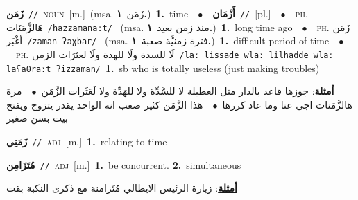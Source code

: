 \documentclass[10pt,a4paper,twoside]{article} %
\begin{document}
\begin{multicols}{2}
{\setlength\topsep{0pt}\textbf{\foreignlanguage{arabic}{زَمَن}}\ {\color{gray}\texttt{//}\color{black}}\ \textsc{noun}\ [m.]\ \color{gray}(msa. \foreignlanguage{arabic}{زَمَن}~\foreignlanguage{arabic}{\textbf{١.}})\color{black}\ \textbf{1.}~time\ \ $\bullet$\ \ \setlength\topsep{0pt}\textbf{\foreignlanguage{arabic}{أَزْمَان}}\ {\color{gray}\texttt{//}\color{black}}\ [pl.]\ \ $\bullet$\ \ \textsc{ph.} \color{gray} \foreignlanguage{arabic}{هَالزَّمَنَات}\color{black}\ {\color{gray}\texttt{/{\sffamily hazzamanaːt}/}\color{black}}\ \color{gray} (msa. \foreignlanguage{arabic}{منذ زمن بعيد}~\foreignlanguage{arabic}{\textbf{١.}})\color{black}\ \textbf{1.}~long time ago\ \ $\bullet$\ \ \textsc{ph.} \color{gray} \foreignlanguage{arabic}{زَمَن أغْبَر}\color{black}\ {\color{gray}\texttt{/{\sffamily zaman ʔaɣbar}/}\color{black}}\ \color{gray} (msa. \foreignlanguage{arabic}{فترة زمنيَّة صعبة}~\foreignlanguage{arabic}{\textbf{١.}})\color{black}\ \textbf{1.}~difficult period of time\ \ $\bullet$\ \ \textsc{ph.} \color{gray} \foreignlanguage{arabic}{لَا للسدة ولَا للهدة ولَا لعثرَات الزمن}\color{black}\ {\color{gray}\texttt{/{\sffamily laː lissade wlaː lilhadde wlaː laʕaθraːt ʔizzaman}/}\color{black}}\ \textbf{1.}~sb who is totally useless (just making troubles)\  \begin{flushright}\color{gray}\foreignlanguage{arabic}{\textbf{\underline{\foreignlanguage{arabic}{أمثلة}}}: جوزها قاعد بالدار مثل العطيلة لا للسَّدِّة ولا للهَدِّة ولا لَعَثَرات الزَّمَن\ $\bullet$\ \  مرة هالزَّمَنات اجى عنا وما عاد كررها\ $\bullet$\ \  هذا الزَّمَن كثير صعب انه الواحد يقدر يتزوج ويفتح بيت بسن صغير}\end{flushright}\color{black}} \vspace{2mm}

{\setlength\topsep{0pt}\textbf{\foreignlanguage{arabic}{زَمَنِي}}\ {\color{gray}\texttt{//}\color{black}}\ \textsc{adj}\ [m.]\ \textbf{1.}~relating to time\ } \vspace{2mm}

{\setlength\topsep{0pt}\textbf{\foreignlanguage{arabic}{مُتَزَامِن}}\ {\color{gray}\texttt{//}\color{black}}\ \textsc{adj}\ [m.]\ \textbf{1.}~be concurrent.  \textbf{2.}~simultaneous\  \begin{flushright}\color{gray}\foreignlanguage{arabic}{\textbf{\underline{\foreignlanguage{arabic}{أمثلة}}}: زيارة الرئيس الايطالي مُتَزامنة مع ذكرى النكبة بقت}\end{flushright}\color{black}} \vspace{2mm}


\end{multicols}
\end{document}
